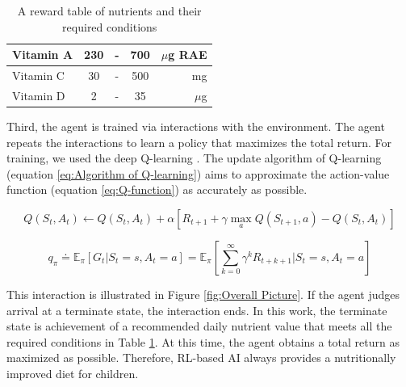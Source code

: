 \documentclass{article}
\begin{document}
\begin{table}[ht]
\begin{tabular}{|l|ccc|r|}
Vitamin A                                                       & 230                  & -                & 700                   & $\mu$g RAE         \\ \hline
Vitamin C                                                       & 30                   & -                & 500                   & mg            \\ \hline
Vitamin D                                                       & 2                    & -                & 35                    & $\mu$g            \\ \hline
\end{tabular}
\caption{A reward table of nutrients and their required conditions}
\label{table: Nutrient Condition Table}
\end{table}

Third, the agent is trained via interactions with the environment. The agent repeats the interactions to learn a policy that maximizes the total return. For training, we used the deep Q-learning \cite{watkins1989learning, mnih2013playing}. The update algorithm of Q-learning (equation \ref{eq:Algorithm of Q-learning}) aims to approximate the action-value function (equation \ref{eq:Q-function}) as accurately as possible. 

\begin{equation}
    Q(S_{t}, A_{t}) \leftarrow Q(S_{t}, A_{t}) + \alpha[R_{t+1} + \gamma \max_{a} Q(S_{t+1}, a) - Q(S_{t}, A_{t})]
\label{eq:Algorithm of Q-learning}
\end{equation}

\begin{equation}
    q_{\pi} \doteq \mathbb{E}_{\pi}[G_{t}|S_{t}=s, A_{t}=a] = \mathbb{E}_{\pi}[\sum_{k=0}^{\infty}\gamma^{k}R_{t+k+1}|S_{t}=s, A_{t}=a]
\label{eq:Q-function}
\end{equation}

This interaction is illustrated in Figure \ref{fig:Overall Picture}. If the agent judges arrival at a terminate state, the interaction ends. In this work, the terminate state is achievement of a recommended daily nutrient value that meets all the required conditions in Table \ref{table: Nutrient Condition Table}. At this time, the agent obtains a total return as maximized as possible. Therefore, RL-based AI always provides a nutritionally improved diet for children.

\listoffigures
\listoftables

\medskip


\end{document}
